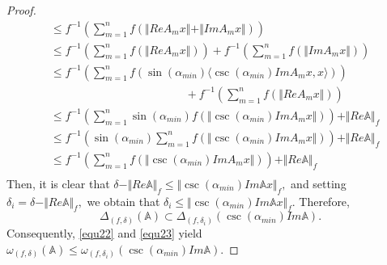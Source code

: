\documentclass[12pt]{article}
\begin{document}
\begin{proof}
\begin{align*}
&\leq f^{-1} \left( \sum\limits_{m=1}^{n}f\left( \Vert ReA_{m}x \Vert + \Vert Im A_{m}x \Vert \right)  \right) \\
&\leq f^{-1} \left( \sum\limits_{m=1}^{n}f\left( \Vert ReA_{m}x \Vert \right)  \right)+f^{-1} \left( \sum\limits_{m=1}^{n}f\left( \Vert Im A_{m}x \Vert \right)  \right) \\
&\leq f^{-1}\left( \sum\limits_{m=1}^{n}f\left(\sin(\alpha_{min})\langle \csc(\alpha_{min})Im A_{m}x,x\rangle \right)  \right)\\
&\hspace{5cm} +f^{-1} \left( \sum\limits_{m=1}^{n}f\left( \Vert ReA_{m}x \Vert \right)  \right) \\
&\leq f^{-1} \left( \sum\limits_{m=1}^{n}\sin(\alpha_{min})f\left( \Vert \csc(\alpha_{min})ImA_{m}x \Vert \right)  \right)+ \Vert Re \mathbb{A} \Vert_{f}\\
&\leq f^{-1}\left( \sin(\alpha_{min})\sum\limits_{m=1}^{n}f\left( \Vert \csc(\alpha_{min})ImA_{m}x \Vert \right)  \right) + \Vert Re \mathbb{A} \Vert_{f}\\
&\leq f^{-1}\left(\sum\limits_{m=1}^{n}f\left( \Vert \csc(\alpha_{min})ImA_{m}x \Vert \right)  \right) + \Vert Re \mathbb{A} \Vert_{f}\\
\end{align*}
Then, it is clear that
\(
\delta - \Vert Re \mathbb{A} \Vert_{f} \leq  \Vert \csc(\alpha_{min})Im\mathbb{A}x \Vert_{f},
\)
and setting $\delta_{i}=\delta - \Vert Re \mathbb{A} \Vert_{f},   $
we obtain that
\(
\delta_{i} \leq  \Vert \csc(\alpha_{min})Im\mathbb{A}x \Vert_{f}.
\)
Therefore,
\begin{equation}
\label{equ23}
\Delta_{(f,\delta)}(\mathbb{A})\subset\Delta_{(f,\delta_{i})}\left( \csc(\alpha_{min})Im\mathbb{A} \right) .
\end{equation}
Consequently, \eqref{equ22} and \eqref{equ23} yield
\(
\omega_{(f,\delta)}(\mathbb{A})\leq \omega_{(f,\delta_{i})}(\csc(\alpha_{min})Im\mathbb{A}).
\)
 \end{proof}
\end{document}
